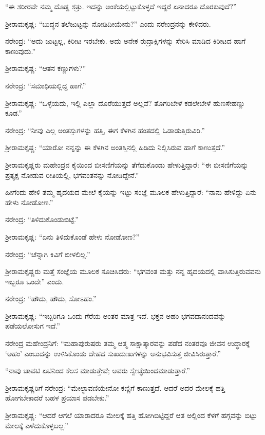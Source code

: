 “ಈ ಶರೀರವೇ ನಮ್ಮ ದೊಡ್ಡ ಶತ್ರು. ಇದನ್ನು ಅಂಕೆಯಲ್ಲಿಟ್ಟುಕೊಳ್ಳದೆ ಇದ್ದರೆ ಏನಾದರೂ ದೊರಕುವುದೆ?”

ಶ‍್ರೀರಾಮಕೃಷ್ಣ: “ಬುದ್ಧನ ತಲೆಜುಟ್ಟನ್ನು ನೋಡಿದೀಯೇನು?” ಎಂದು ನರೇಂದ್ರನನ್ನು ಕೇಳಿದರು.

ನರೇಂದ್ರ: “ಅದು ಜುಟ್ಟಲ್ಲ, ಕಿರೀಟ ಇರಬೇಕು. ಅದು ಅನೇಕ ರುದ್ರಾಕ್ಷಿಗಳನ್ನು ಸೇರಿಸಿ ಮಾಡಿದ ಕಿರೀಟದ ಹಾಗೆ ಕಾಣುವುದು.”

ಶ‍್ರೀರಾಮಕೃಷ್ಣ: “ಆತನ ಕಣ್ಣುಗಳು?”

ನರೇಂದ್ರ: “ಸಮಾಧಿಯಲ್ಲಿದ್ದ ಹಾಗೆ.”

ಶ‍್ರೀರಾಮಕೃಷ್ಣ: “ಒಳ್ಳೆಯದು, ಇಲ್ಲಿ ಎಲ್ಲಾ ದೊರೆಯುತ್ತದೆ ಅಲ್ಲವೆ? ತೊಗರಿಬೇಳೆ ಕಡಲೇಬೇಳೆ ಹುಣಸೇಹಣ್ಣು ಕೂಡ.”

ನರೇಂದ್ರ: “ನೀವು ಎಲ್ಲ ಅಂತಸ್ತುಗಳನ್ನು ಹತ್ತಿ, ಈಗ ಕೆಳಗಿನ ಹಂತದಲ್ಲಿ ಓಡಾಡುತ್ತಿರುವಿರಿ.”

ಶ‍್ರೀರಾಮಕೃಷ್ಣ: “ಯಾರೋ ನನ್ನನ್ನು ಈ ಕೆಳಗಿನ ಅಂತಸ್ತಿನಲ್ಲಿ ಹಿಡಿದು ನಿಲ್ಲಿಸಿರುವ ಹಾಗೆ ಕಾಣುತ್ತದೆ.”

ಶ‍್ರೀರಾಮಕೃಷ್ಣರು ಮಹೇಂದ್ರನ ಕೈಯಿಂದ ಬೀಸಣಿಗೆಯನ್ನು ತೆಗೆದುಕೊಂಡು ಹೇಳುತ್ತಿದ್ದಾರೆ: “ಈ ಬೀಸಣಿಗೆಯನ್ನು ಪ್ರತ್ಯಕ್ಷ ನೋಡುವ ರೀತಿಯಲ್ಲಿ, ಭಗವಂತನನ್ನು ನೋಡಿದ್ದೇನೆ.”

ಹೀಗೆಂದು ಹೇಳಿ ತಮ್ಮ ಹೃದಯದ ಮೇಲೆ ಕೈಯನ್ನು ಇಟ್ಟು ಸಂಜ್ಞೆ ಮೂಲಕ ಹೇಳುತ್ತಿದ್ದಾರೆ: “ನಾನು ಹೇಳಿದ್ದು ಏನು ಹೇಳು ನೋಡೋಣ.”

ನರೇಂದ್ರ: “ತಿಳಿದುಕೊಂಡುಬಿಟ್ಟೆ.”

ಶ‍್ರೀರಾಮಕೃಷ್ಣ: “ಏನು ತಿಳಿದುಕೊಂಡೆ ಹೇಳು ನೋಡೋಣ?”

ನರೇಂದ್ರ: “ಚೆನ್ನಾಗಿ ಕಿವಿಗೆ ಬೀಳಲಿಲ್ಲ.”

ಶ‍್ರೀರಾಮಕೃಷ್ಣರು ಮತ್ತೆ ಸಂಜ್ಞೆಯ ಮೂಲಕ ಸೂಚಿಸಿದರು: “ಭಗವಂತ ಮತ್ತು ನನ್ನ ಹೃದಯದಲ್ಲಿ ವಾಸಿಸುತ್ತಿರುವವನು ಇಬ್ಬರೂ ಒಂದೇ” ಎಂದು.

ನರೇಂದ್ರ: “ಹೌದು, ಹೌದು, ಸೋಽಹಂ.”

ಶ‍್ರೀರಾಮಕೃಷ್ಣ: “ಇಬ್ಬರಿಗೂ ಒಂದು ಗೆರೆಯ ಅಂತರ ಮಾತ್ರ ಇದೆ. ಭಕ್ತನ ಅಹಂ ಭಗವದಾನಂದವನ್ನು ಪಡೆಯಲೋಸುಗ ಇದೆ.”

\newpage

ನರೇಂದ್ರ ಮಹೇಂದ್ರನಿಗೆ: “ಮಹಾಪುರುಷರು ತಮ್ಮ ಆತ್ಮ ಸಾಕ್ಷಾತ್ಕಾರವನ್ನು ಪಡೆದ ನಂತರವೂ ಜೀವನ ಉದ್ಧಾರಕ್ಕೆ ‘ಅಹಂ’ ಎಂಬುದನ್ನು ಉಳಿಸಿಕೊಂಡು ದೇಹದ ಸುಖದುಃಖಗಳನ್ನು ಅನುಭವಿಸುತ್ತ ಜೀವಿಸಿರುತ್ತಾರೆ.”

\vskip 1pt

“ನಾವು ಚಾವಟಿ ಏಟಿನಿಂದ ಕೆಲಸ ಮಾಡುತ್ತೇವೆ; ಅವರು ಸ್ವೇಚ್ಛೆಯಿಂದ\break ಮಾಡುತ್ತಾರೆ.”

\vskip 1pt

ಶ‍್ರೀರಾಮಕೃಷ್ಣರಿಗೆ ನರೇಂದ್ರ: “ಮೇಲ್ಛಾವಣಿಯೇನೋ ಕಣ್ಣಿಗೆ ಕಾಣುತ್ತದೆ. ಆದರೆ ಅದರ ಮೇಲಕ್ಕೆ ಹತ್ತಿ ಹೋಗಬೇಕಾದರೆ ಬಹಳ ಪ್ರಯಾಸ ಪಡಬೇಕು.”

\vskip 1pt

ಶ‍್ರೀರಾಮಕೃಷ್ಣ: “ಆದರೆ ಆಗಲೆ ಯಾರಾದರೂ ಮೇಲಕ್ಕೆ ಹತ್ತಿ ಹೋಗಿಬಿಟ್ಟಿದ್ದರೆ ಆತ ಅಲ್ಲಿಂದ ಕೆಳಗೆ ಹಗ್ಗವನ್ನು ಬಿಟ್ಟು ಮೇಲಕ್ಕೆ ಎಳೆದುಕೊಳ್ಳಬಲ್ಲ.”

